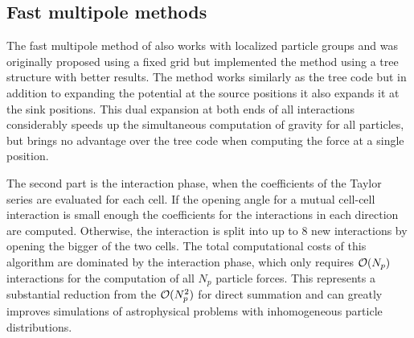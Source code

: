 \subsection{Fast multipole methods}
The fast multipole method of \textcite{1987JCoPh..73..325G} also works with localized particle groups and was originally proposed using a fixed grid but \textcite{2000ApJ...536L..39D} implemented the method using a tree structure with better results. The method works similarly as the tree code but in addition to expanding the potential at the source positions it also expands it at the sink positions. This dual expansion at both ends of all interactions considerably speeds up the simultaneous computation of gravity for all particles, but brings no advantage over the tree code when computing the force at a single position.

The second part is the interaction phase, when the coefficients of the Taylor series are evaluated for each cell. If the opening angle for a mutual cell-cell interaction is small enough the coefficients for the interactions in each direction are computed.  Otherwise, the interaction is split into up to 8 new interactions by opening the bigger of the two cells. The total computational
costs of this algorithm are dominated by the interaction phase, which only requires $\mathcal{O}(N_p)$ interactions for the computation of all $N_p$ particle forces. This represents a substantial reduction from the $\mathcal{O}(N_p^2)$ for direct summation and can greatly improves simulations of astrophysical problems with inhomogeneous particle distributions.
